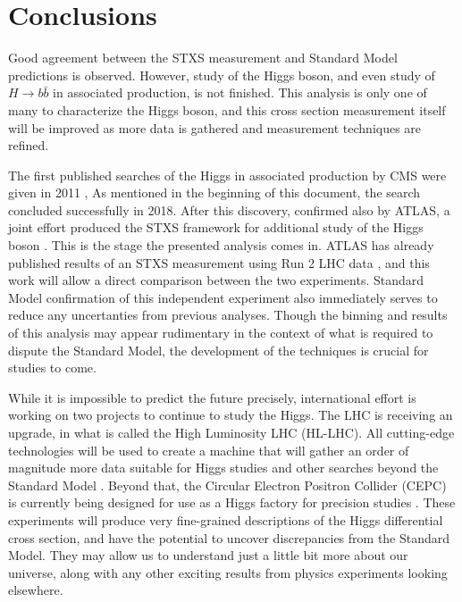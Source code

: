 \chapter{Conclusions} \label{ch:conclusion}

Good agreement between the STXS measurement and Standard Model predictions is observed.
However, study of the Higgs boson, and even study of $H\rightarrow b\bar{b}$ in
associated production, is not finished.
This analysis is only one of many to characterize the Higgs boson,
and this cross section measurement itself will be improved as more data is gathered
and measurement techniques are refined.

The first published searches of the Higgs in associated production by CMS
were given in 2011 \cite{CMS-PAS-HIG-11-012},
As mentioned in the beginning of this document, the search concluded successfully in 2018.
After this discovery, confirmed also by ATLAS,
a joint effort produced the STXS framework for additional study of the
Higgs boson \cite{berger2019simplified}.
This is the stage the presented analysis comes in.
ATLAS has already published results of an STXS measurement using
Run 2 LHC data \cite{Aaboud_2019},
and this work will allow a direct comparison between the two experiments.
Standard Model confirmation of this independent experiment also immediately serves to
reduce any uncertanties from previous analyses.
Though the binning and results of this analysis may appear rudimentary
in the context of what is required to dispute the Standard Model,
the development of the techniques is crucial for studies to come.

While it is impossible to predict the future precisely,
international effort is working on two projects to continue to study the Higgs.
The LHC is receiving an upgrade, in what is called the High Luminosity LHC (HL-LHC).
All cutting-edge technologies will be used to create a machine that will gather
an order of magnitude more data suitable for Higgs studies and
other searches beyond the Standard Model \cite{osti_1365580}.
Beyond that, the Circular Electron Positron Collider (CEPC) is currently being designed
for use as a Higgs factory for precision studies \cite{thecepcstudygroup2018cepc}.
These experiments will produce very fine-grained descriptions of
the Higgs differential cross section, and have the potential to uncover
discrepancies from the Standard Model.
They may allow us to understand just a little bit more about our universe,
along with any other exciting results from physics experiments looking elsewhere.


